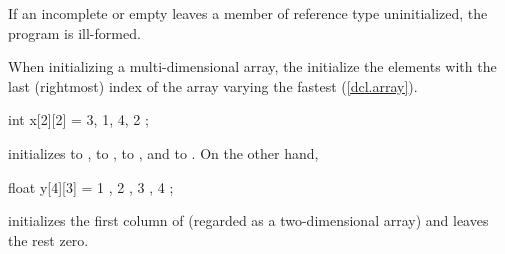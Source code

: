 \pnum
If an incomplete or empty
leaves a member of reference type uninitialized, the program is ill-formed.

\pnum
When initializing a multi-dimensional array,
the
initialize the elements with the last (rightmost) index of the array
varying the fastest (\ref{dcl.array}).
\begin{example}

\begin{codeblock}
int x[2][2] = { 3, 1, 4, 2 };
\end{codeblock}

initializes
to
,
to
,
to
,
and
to
.
On the other hand,

\begin{codeblock}
float y[4][3] = {
  { 1 }, { 2 }, { 3 }, { 4 }
};
\end{codeblock}

initializes the first column of
(regarded as a two-dimensional array)
and leaves the rest zero.
\end{example}

